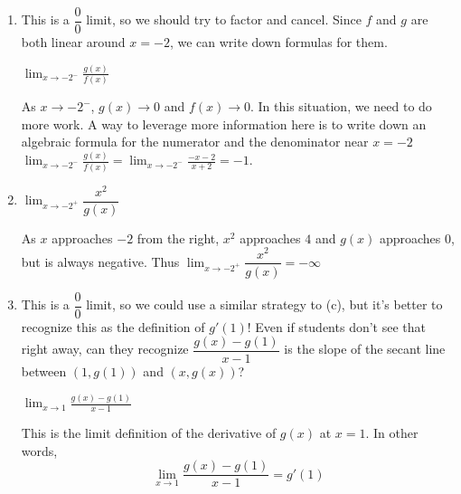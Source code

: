 \documentclass{article}
\begin{document}
\begin{enumerate}
\begin{enumerate}[topsep=0pt]
  \item

    \begin{workshop}
      This is a $\dfrac{0}{0}$ limit, so we should try to factor and cancel. Since $f$ and $g$ are both linear around $x = -2$, we can write down formulas for them.
    \end{workshop}

    \begin{problem}[{\vfill}]
      $\displaystyle \lim_{x\to -2^-} \frac{g(x)}{f(x)}$
    \end{problem}

    \begin{solution}
      As $x \to -2^-$, $g(x) \to 0 $ and $f(x) \to 0$.  In this situation, we need to do more work.  A way to leverage more information here is to write down an algebraic formula for the numerator and the denominator near $x=-2$
      $\displaystyle
      \lim_{x \to -2^-} \frac{g(x)}{f(x)} =  \lim_{x \to -2^-} \frac{-x-2}{x+2} =\boxed{-1}$. 
    \end{solution}

  \item
    \begin{problem}[\vfill]
      $\displaystyle \lim_{x \to -2^+} \dfrac{x^2}{g(x)}$
    \end{problem}

    \begin{solution}
        As $x$ approaches $-2$ from the right, $x^2$ approaches $4$ and $g(x)$ approaches 0, but is always negative. Thus    $\displaystyle \lim_{x \to -2^+} \dfrac{x^2}{g(x)} = -\infty$
    \end{solution}

  \item

    \begin{workshop}
      This is a $\dfrac{0}{0}$ limit, so we could use a similar strategy to (c), but it's better to recognize this as the definition of $g'(1)$! Even if students don't see that right away, can they recognize $\dfrac{g(x) - g(1)}{x - 1}$ is the slope of the secant line between $(1, g(1))$ and $(x, g(x))$? 
    \end{workshop}

    \begin{problem}[{\vfill}]
      $\displaystyle \lim_{x \to 1} \frac{g(x) - g(1)}{x - 1}$
    \end{problem}

    \begin{solution}
        This is the limit definition of the derivative of $g(x)$ at $x=1$. In other words,
         $$\displaystyle \lim_{x \to 1} \frac{g(x) - g(1)}{x - 1}=g'(1)$$
        

\end{solution}
\end{enumerate}
\end{enumerate}
\end{document}
